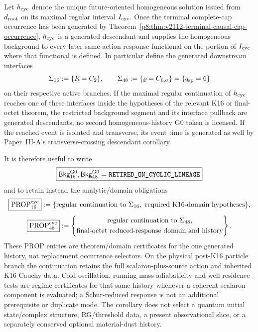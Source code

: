 \documentclass[12pt,a4paper]{article}
\begin{document}
\begin{corollary}
\label{p8:cor:v296-cyclic-downstream-history-propagation}
Let \(h_{\rm cyc}\) denote the unique future-oriented homogeneous solution
issued from \(d_{\rm root}\) on its maximal regular interval
\(I_{\rm cyc}\).  Once the terminal complete-cap occurrence has been generated by
Theorem~\ref{p8:thm:v2112-terminal-causal-cap-occurrence},
\(h_{\rm cyc}\) is a generated descendant and supplies the homogeneous
background to every later same-action response functional on the portion of
\(I_{\rm cyc}\) where that functional is defined.  In particular define the
generated downstream interfaces
\[
 \Sigma_{16}:=\{R=C_2\},\qquad
 \Sigma_{48}:=\{\varrho=C_{6,\sigma}\}
              =\{q_{\rm sp}=6\}
\]
on their respective active branches.  If the maximal regular continuation of
\(h_{\rm cyc}\) reaches one of these interfaces inside the hypotheses of the
relevant K16 or final-octet theorem, the restricted background segment and its
interface pullback are generated descendants; no second homogeneous-history
G0 token is licensed.  If the reached event is isolated and transverse, its
event time is generated as well by Paper~III-A's transverse-crossing
descendant corollary.

It is therefore useful to write
\[
 \boxed{\mathsf{Bkg}^{\rm G0}_{16},\mathsf{Bkg}^{\rm G0}_{48}
        =\texttt{RETIRED\_ON\_CYCLIC\_LINEAGE}}
\]
and to retain instead the analytic/domain obligations
\[
 \boxed{\mathrm{PROP}^{\rm cyc}_{16}}
 :=\{\text{regular continuation to }\Sigma_{16},
       \text{ required K16-domain hypotheses}\},
\]
\[
 \boxed{\mathrm{PROP}^{\rm cyc}_{48}}
 :=\left\{\begin{gathered}
 \text{regular continuation to }\Sigma_{48},\\
 \text{final-octet reduced-response domain and history}
 \end{gathered}\right\}.
\]
These \(\mathrm{PROP}\) entries are theorem/domain certificates for the one
generated history, not replacement occurrence selectors.  On the physical
post-K16 particle branch the continuation retains the full scalaron-plus-source
action and inherited K16 Cauchy data.  Cold oscillation, running-mass
adiabaticity and well-residence tests are regime certificates for that same
history whenever a coherent scalaron component is evaluated; a Schur-reduced
response is not an additional prerequisite or duplicate mode.  The corollary does
not select a quantum initial state/complex structure, RG/threshold data, a
present observational slice, or a separately conserved optional material-dust
history.
\end{corollary}
\end{document}
